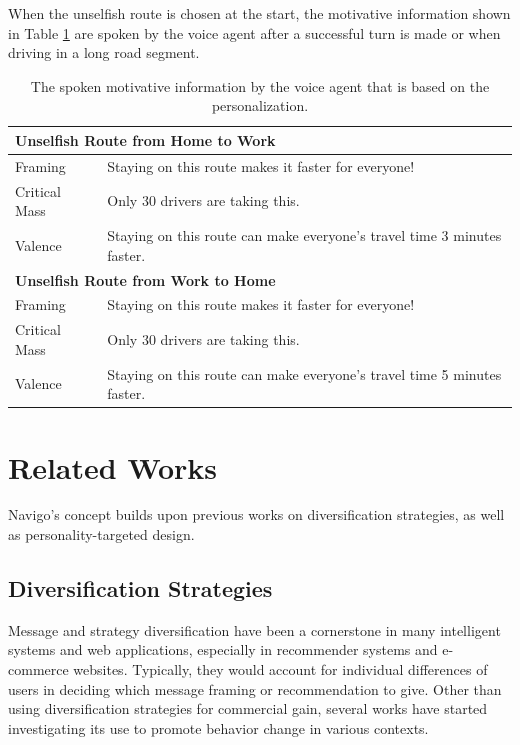 When the unselfish route is chosen at the start, the motivative information shown in Table \ref{tab:s4-motivativeinfo} are spoken by the voice agent after a successful turn is made or when driving in a long road segment. 

\begin{table}[ht]
	\centering
	\caption{The spoken motivative information by the voice agent that is based on the personalization.}
	\begin{tabular}{l l}
		\toprule
		\multicolumn{2}{l}{\textbf{Unselfish Route from Home to Work}} \\
		\midrule
		Framing & Staying on this route makes it faster for everyone! \\
		Critical Mass & Only 30 drivers are taking this. \\
		Valence & Staying on this route can make everyone's travel time 3 minutes faster. \\
		\toprule
		\multicolumn{2}{l}{\textbf{Unselfish Route from Work to Home}} \\
		\midrule
		Framing & Staying on this route makes it faster for everyone! \\
		Critical Mass & Only 30 drivers are taking this. \\
		Valence & Staying on this route can make everyone's travel time 5 minutes faster. \\
		\bottomrule
	\end{tabular}
	\label{tab:s4-motivativeinfo}
\end{table}

\section{Related Works}
Navigo's concept builds upon previous works on diversification strategies, as well as personality-targeted design.

\subsection{Diversification Strategies}
Message and strategy diversification have been a cornerstone in many intelligent systems and web applications, especially in recommender systems and e-commerce websites. Typically, they would account for individual differences of users in deciding which message framing or recommendation to give. Other than using diversification strategies for commercial gain, several works have started investigating its use to promote behavior change in various contexts.

